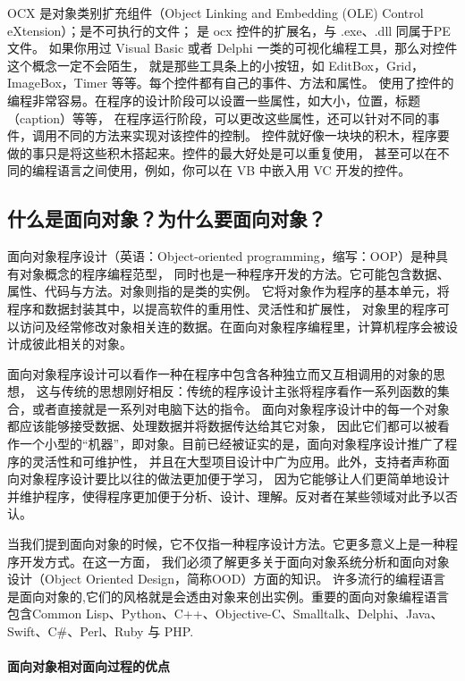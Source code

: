 \documentclass{book}
\begin{document}
OCX 是对象类别扩充组件（Object Linking and Embedding (OLE) Control eXtension）；是不可执行的文件； 
是 ocx 控件的扩展名，与 .exe、.dll 同属于PE文件。
如果你用过 Visual Basic 或者 Delphi 一类的可视化编程工具，那么对控件这个概念一定不会陌生，
就是那些工具条上的小按钮，如 EditBox，Grid，ImageBox，Timer 等等。每个控件都有自己的事件、方法和属性。
使用了控件的编程非常容易。在程序的设计阶段可以设置一些属性，如大小，位置，标题（caption）等等，
在程序运行阶段，可以更改这些属性，还可以针对不同的事件，调用不同的方法来实现对该控件的控制。
控件就好像一块块的积木，程序要做的事只是将这些积木搭起来。控件的最大好处是可以重复使用，
甚至可以在不同的编程语言之间使用，例如，你可以在 VB 中嵌入用 VC 开发的控件。


\subsection{什么是面向对象？为什么要面向对象？}

面向对象程序设计（英语：Object-oriented programming，缩写：OOP）是种具有对象概念的程序编程范型，
同时也是一种程序开发的方法。它可能包含数据、属性、代码与方法。对象则指的是类的实例。
它将对象作为程序的基本单元，将程序和数据封装其中，以提高软件的重用性、灵活性和扩展性，
对象里的程序可以访问及经常修改对象相关连的数据。在面向对象程序编程里，计算机程序会被设计成彼此相关的对象。

面向对象程序设计可以看作一种在程序中包含各种独立而又互相调用的对象的思想，
这与传统的思想刚好相反：传统的程序设计主张将程序看作一系列函数的集合，或者直接就是一系列对电脑下达的指令。
面向对象程序设计中的每一个对象都应该能够接受数据、处理数据并将数据传达给其它对象，
因此它们都可以被看作一个小型的“机器”，即对象。目前已经被证实的是，面向对象程序设计推广了程序的灵活性和可维护性，
并且在大型项目设计中广为应用。此外，支持者声称面向对象程序设计要比以往的做法更加便于学习，
因为它能够让人们更简单地设计并维护程序，使得程序更加便于分析、设计、理解。反对者在某些领域对此予以否认。

当我们提到面向对象的时候，它不仅指一种程序设计方法。它更多意义上是一种程序开发方式。在这一方面，
我们必须了解更多关于面向对象系统分析和面向对象设计（Object Oriented Design，简称OOD）方面的知识。
许多流行的编程语言是面向对象的,它们的风格就是会透由对象来创出实例。重要的面向对象编程语言包含Common Lisp、Python、C++、Objective-C、Smalltalk、Delphi、Java、Swift、C\#、Perl、Ruby 与 PHP.

\paragraph{面向对象相对面向过程的优点}
\end{document}
